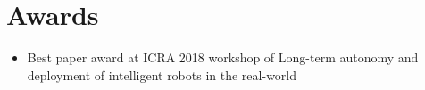 \section{Awards}

\begin{itemize}[label=$\cdot$]
    \item Best paper award at ICRA 2018 workshop of Long-term autonomy and deployment of intelligent robots in the real-world
\end{itemize}
